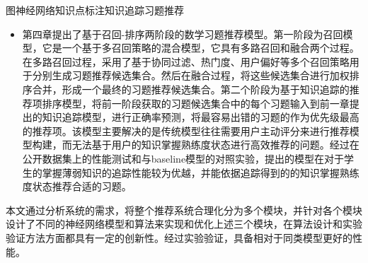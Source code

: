 \begin{abstractC}{图神经网络}{知识点标注}{知识追踪}{习题推荐}{}
\begin{itemize}
		\item 第四章提出了基于召回-排序两阶段的数学习题推荐模型。第一阶段为召回模型，它是一个基于多召回策略的混合模型，它具有多路召回和融合两个过程。在多路召回过程，采用了基于协同过滤、热门度、用户偏好等多个召回策略用于分别生成习题推荐候选集合。然后在融合过程，将这些候选集合进行加权排序合并，形成一个最终的习题推荐候选集合。第二个阶段为基于知识追踪的推荐项排序模型，将前一阶段获取的习题候选集合中的每个习题输入到前一章提出的知识追踪模型，进行正确率预测，将最容易出错的习题的作为优先级最高的推荐项。该模型主要解决的是传统模型往往需要用户主动评分来进行推荐模型构建，而无法基于用户的知识掌握熟练度状态进行高效推荐的问题。经过在公开数据集上的性能测试和与baseline模型的对照实验，提出的模型在对于学生的掌握薄弱知识的追踪性能较为优越，并能依据追踪得到的的知识掌握熟练度状态推荐合适的习题。
	\end{itemize}

	本文通过分析系统的需求，将整个推荐系统合理化分为多个模块，并针对各个模块设计了不同的神经网络模型和算法来实现和优化上述三个模块，在算法设计和实验验证方法方面都具有一定的创新性。经过实验验证，具备相对于同类模型更好的性能。
\end{abstractC}